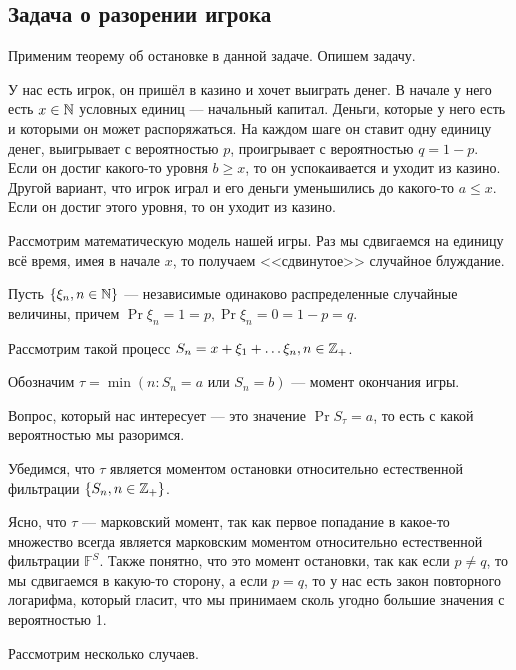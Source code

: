 \subsection{Задача о разорении игрока}

Применим теорему об остановке в данной задаче. Опишем задачу.

У нас есть игрок, он пришёл в казино и хочет выиграть денег. В начале у него
есть $x \in \mathbb{N}$ условных единиц --- начальный капитал. Деньги, которые у него есть
и которыми он может распоряжаться. На каждом шаге он ставит одну единицу денег,
выигрывает с вероятностью $p$, проигрывает с вероятностью $q = 1 - p$. Если
он достиг какого-то уровня $b \geq x$, то он успокаивается и уходит из казино.
Другой вариант, что игрок играл и его деньги уменьшились до какого-то $a \leq x$.
Если он достиг этого уровня, то он уходит из казино.

Рассмотрим математическую модель нашей игры. Раз мы сдвигаемся на единицу всё время,
имея в начале $x$, то получаем <<сдвинутое>> случайное блуждание.

Пусть $\{\xi_n, n \in \mathbb{N}\}$ --- независимые одинаково распределенные
случайные величины, причем $\Pr{\xi_n = 1} = p, \Pr{\xi_n = 0} = 1 - p = q$.

Рассмотрим такой процесс $S_n = x + \xi_1 + \ldots \xi_n, n \in \mathbb{Z}_+$.

Обозначим $\tau = \min(n : S_n = a \text{ или } S_n = b)$ --- момент окончания
игры.

Вопрос, который нас интересует --- это значение $\Pr{S_\tau = a}$, то есть с какой
вероятностью мы разоримся.

Убедимся, что $\tau$ является моментом остановки относительно естественной фильтрации
$\{S_n, n \in \mathbb{Z}_+\}$. 

Ясно, что $\tau$ --- марковский момент, так как первое попадание в какое-то множество
всегда является марковским моментом относительно естественной фильтрации $\mathbb{F}^S$.
Также понятно, что это момент остановки, так как если $p \neq q$, то мы сдвигаемся
в какую-то сторону, а если $p = q$, то у нас есть закон повторного логарифма,
который гласит, что мы принимаем сколь угодно большие значения с вероятностью 1.

Рассмотрим несколько случаев.

